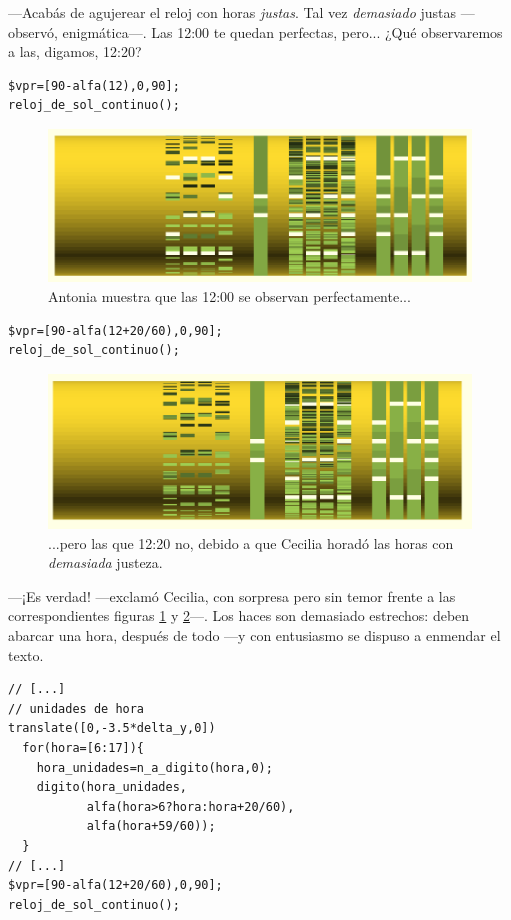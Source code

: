 ---Acabás de agujerear el reloj con horas \emph{justas}. Tal vez
\emph{demasiado} justas ---observó, enigmática---. Las 12:00 te quedan
perfectas, pero... ¿Qué observaremos a las, digamos, 12:20?

\begin{lstlisting}
$vpr=[90-alfa(12),0,90];
reloj_de_sol_continuo();
\end{lstlisting}%


\begin{figure}[ht]
  \centering
  \includegraphics[width=.8\textwidth]{imagenes/hora-unidades-3}
  \caption{Antonia muestra que las 12:00 se observan perfectamente...}
  \label{fig:hora-unidades-3}
\end{figure}


\begin{lstlisting}
$vpr=[90-alfa(12+20/60),0,90];
reloj_de_sol_continuo();
\end{lstlisting}%


\begin{figure}[ht]
  \centering
  \includegraphics[width=.8\textwidth]{imagenes/hora-unidades-2}
  \caption{...pero las que 12:20 no, debido a que Cecilia horadó las
    horas con \emph{demasiada} justeza.}
  \label{fig:hora-unidades-2}
\end{figure}


---¡Es verdad! ---exclamó Cecilia, con sorpresa pero sin temor frente
a las correspondientes figuras \ref{fig:hora-unidades-3} y
\mbox{\ref{fig:hora-unidades-2}---.} Los haces son demasiado estrechos: deben
abarcar una hora, después de todo ---y con entusiasmo se dispuso a
enmendar el texto.

\begin{lstlisting}
// [...]
// unidades de hora
translate([0,-3.5*delta_y,0])
  for(hora=[6:17]){
    hora_unidades=n_a_digito(hora,0);
    digito(hora_unidades,
           alfa(hora>6?hora:hora+20/60),
           alfa(hora+59/60));
  }
// [...]
$vpr=[90-alfa(12+20/60),0,90];
reloj_de_sol_continuo();
\end{lstlisting}%


